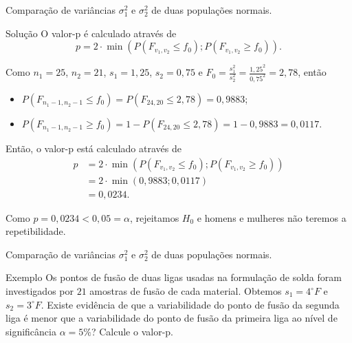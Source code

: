 \documentclass[9pt]{beamer}
\begin{document}
\begin{frame}{Comparação de variâncias $\sigma_1^2$ e $\sigma_2^2$ de duas populações normais.}

\begin{block}{Solução}
	O valor-p é calculado através de
	$$p = 2 \cdot \min \left( P\left( F_{v_1, v_2} \leq f_0 \right); P\left( F_{v_1, v_2} \geq f_0 \right) \right).$$
	
	Como $n_1=25$, $n_2=21$, $s_1 = 1,25$, $s_2=0,75$ e $F_0 = \frac{s_1^2}{s_2^2} = \frac{1,25^2}{0,75^2} = 2,78$, então 
	\begin{itemize}
		\item $P\left( F_{n_1-1, n_2-1} \leq f_0 \right) = P\left( F_{24, 20} \leq 2,78 \right) = 0,9883$;
		\item $P\left( F_{n_1-1, n_2-1} \geq f_0 \right) =1 -  P\left( F_{24, 20} \leq 2,78 \right) =1- 0,9883 = 0,0117$.
	\end{itemize}

	Então, o valor-p está calculado através de
	\begin{align*}
		p &= 2 \cdot \min \left( P\left( F_{v_1, v_2} \leq f_0 \right); P\left( F_{v_1, v_2} \geq f_0 \right) \right)\\
		&= 2 \cdot \min(0,9883; 0,0117)\\
		&= 0,0234.
	\end{align*}
	
	Como $p=0,0234 < 0,05=\alpha$, rejeitamos $H_0$ e homens e mulheres não teremos a repetibilidade.
\end{block}
\end{frame}

\begin{frame}{Comparação de variâncias $\sigma_1^2$ e $\sigma_2^2$ de duas populações normais.}

\large

\begin{block}{Exemplo}
	Os pontos de fusão de duas ligas usadas na formulação de solda foram investigados por $21$ amostras de fusão de cada material. Obtemos $s_1=4^\circ F$  e $s_2=3^\circ F$. Existe evidência de que a variabilidade do ponto de fusão da segunda liga é menor que a variabilidade do ponto de fusão da primeira liga ao nível de significância $\alpha=5\%$? Calcule o valor-p. 
\end{block}

\normalsize

\end{frame}
\end{document}
